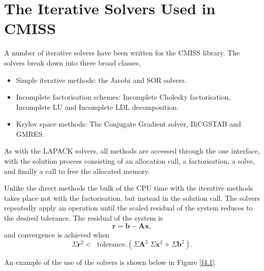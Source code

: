 
\section{The Iterative Solvers Used in CMISS}\label{s4.0}

A number of iterative solvers have been written for the CMISS library.
The solvers break down into three broad classes,
\begin{itemize}
\item	Simple iterative methods: the Jacobi and SOR solvers.
\item	Incomplete factorisation schemes: Incomplete Cholesky factorisation,
  Incomplete LU and Incomplete LDL decomposition.
\item Krylov space methods: The Conjugate Gradient solver, BiCGSTAB and GMRES.
\end {itemize}
As with the LAPACK solvers, all methods are accessed through the one interface,
with the solution process consisting of an allocation call, a factorisation,
a solve, and finally a call to free the allocated memory.

Unlike the direct methods the bulk of the CPU time with the iterative methods 
takes place not with the factorisation, but instead in the solution call.
The solvers repeatedly apply an operation until the scaled residual of the
system reduces to the desired tolerance. The residual of the system is
\begin{equation}\label{e4.0.1}
\mathbf{r = b - A x},
\end{equation}
and convergence is achieved when 
\begin{equation}\label{e4.0.2}
\Sigma \mathbf{r}^2 < \;\; 
  {\text{tolerance}} . \left(
        \Sigma \mathbf{A}^2 \; \Sigma \mathbf{x}^2 + \Sigma \mathbf{b}^2
                     \right).
\end{equation}


An example of the use of the solvers is shown below in Figure \ref{f4.1}.

